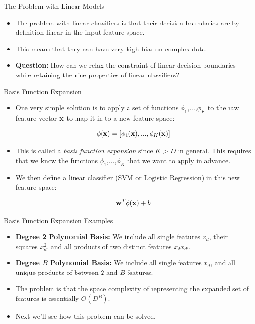 \documentclass[serif,xcolor=pdftex,dvipsnames,table,hyperref={bookmarks=false}]{beamer}
\begin{document}
\begin{frame}[t]{The Problem with Linear Models}

\begin{itemize}
\setlength{\itemsep}{8pt}
\item The problem with linear classifiers is that their decision boundaries are by definition linear in the input feature space.

\pause\item This means that they can have very high bias on complex data.

\pause\item \textbf{Question:} How can we relax the constraint of linear decision boundaries while retaining the nice properties of linear classifiers?

\end{itemize}
\end{frame}

\begin{frame}[t]{Basis Function Expansion}

\begin{itemize}
\setlength{\itemsep}{8pt}
\item One very simple solution is to apply a set of functions $\phi_1$,...,$\phi_K$ to the
raw feature vector ${\mathbf{x}}$ to map it in to a new feature space:

$$\phi({\mathbf{x}}) = [\phi_1({\mathbf{x}}),...,\phi_K({\mathbf{x}})]$$

\pause \item This is called a \textit{basis function expansion} since $K>D$ in general. This requires that we know the functions $\phi_1$,...,$\phi_K$ that we want to apply in advance.

\pause\item We then define a linear classifier (SVM or Logistic Regression) in this new feature space:

$${\mathbf{w}}^T\phi({\mathbf{x}}) + b$$

\end{itemize}
\end{frame}

\begin{frame}[t]{Basis Function Expansion Examples}

\begin{itemize}
\setlength{\itemsep}{8pt}
\item \textbf{Degree 2 Polynomial Basis:} We include all single features $x_d$, their squares $x_d^2$, and all products of two distinct features $x_dx_{d'}$.

\pause \item \textbf{Degree $B$ Polynomial Basis:} We include all single features $x_d$, and all unique products of between $2$ and $B$ features.

\pause \item The problem is that the space complexity of representing the expanded set of features is essentially $O(D^B)$.

\pause \item Next we'll see how this problem can be solved.

\end{itemize}
\end{frame}
\end{document}
